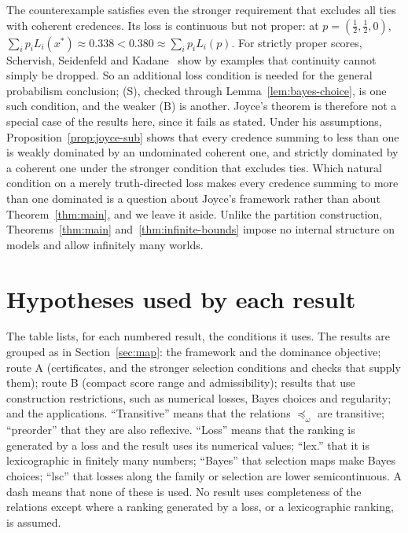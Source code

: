 \documentclass[11pt]{article}
\theoremstyle{definition}
\theoremstyle{remark}
\begin{document}
The counterexample satisfies even the stronger requirement that excludes all ties with coherent credences. Its loss is continuous but not proper: at $p=(\tfrac12,\tfrac12,0)$, $\sum_ip_iL_i(x^*)\approx0.338<0.380\approx\sum_ip_iL_i(p)$. For strictly proper scores, Schervish, Seidenfeld and Kadane~\cite{SSK09} show by examples that continuity cannot simply be dropped. So an additional loss condition is needed for the general probabilism conclusion; (S), checked through Lemma~\ref{lem:bayes-choice}, is one such condition, and the weaker (B) is another. Joyce's theorem is therefore not a special case of the results here, since it fails as stated. Under his assumptions, Proposition~\ref{prop:joyce-sub} shows that every credence summing to less than one is weakly dominated by an undominated coherent one, and strictly dominated by a coherent one under the stronger condition that excludes ties. Which natural condition on a merely truth-directed loss makes every credence summing to more than one dominated is a question about Joyce's framework rather than about Theorem~\ref{thm:main}, and we leave it aside. Unlike the partition construction, Theorems~\ref{thm:main} and~\ref{thm:infinite-bounds} impose no internal structure on models and allow infinitely many worlds.


\section{Hypotheses used by each result}\label{sec:hypotheses}
The table lists, for each numbered result, the conditions it uses. The results are grouped as in Section~\ref{sec:map}: the framework and the dominance objective; route A (certificates, and the stronger selection conditions and checks that supply them); route B (compact score range and admissibility); results that use construction restrictions, such as numerical losses, Bayes choices and regularity; and the applications. ``Transitive'' means that the relations $\preceq_\omega$ are transitive; ``preorder'' that they are also reflexive. ``Loss'' means that the ranking is generated by a loss and the result uses its numerical values; ``lex.'' that it is lexicographic in finitely many numbers; ``Bayes'' that selection maps make Bayes choices; ``lsc'' that losses along the family or selection are lower semicontinuous. A dash means that none of these is used. No result uses completeness of the relations except where a ranking generated by a loss, or a lexicographic ranking, is assumed.
\end{document}
